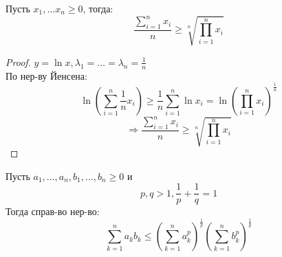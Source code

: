 \begin{example}
Пусть $x_1, \ldots x_n \geq 0$, тогда:
\[
  \frac{\sum_{i = 1}^{n} x_i}{n} \geq \sqrt[n]{\prod_{i = 1}^{n} x_i}
\]
\end{example}
\begin{proof}
$y = \ln x, \lambda_1 = \ldots = \lambda_n = \frac{1}{n}$ \\
По нер-ву Йенсена:
\[
\ln\left(\sum_{i = 1}^{n} \frac{1}{n}x_i\right) \geq \frac{1}{n}\sum_{i = 1}^{n} \ln x_i = \ln\left(\prod_{i = 1}^{n} x_i\right)^{\frac{1}{n}}
\]
\[
\Rightarrow \frac{\sum_{i = 1}^{n} x_i}{n} \geq \sqrt[n]{\prod_{i = 1}^{n} x_i}
\]
\end{proof}
\begin{example}
  Пусть $a_1, \ldots, a_n, b_1, \ldots, b_n \geq 0$ и
  \[
    p, q > 1, \frac{1}{p} + \frac{1}{q} = 1
  \]
  Тогда справ-во нер-во:
  \[
  \sum_{k = 1}^{n} a_k b_k \leq \left(\sum_{k = 1}^{n} a_k^{p}\right)^{\frac{1}{p}} \left(\sum_{k = 1}^{n} b_k^{p}\right)^{\frac{1}{p}}
  \]

\end{example}
